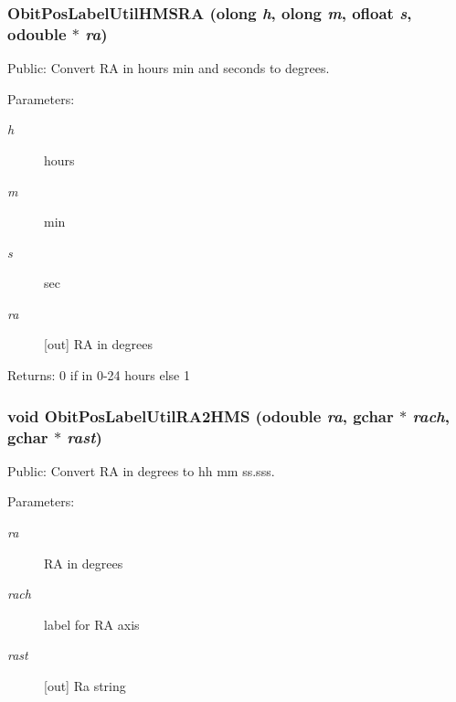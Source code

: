 \subsubsection{ Obit\-Pos\-Label\-Util\-HMSRA ({\bf olong} {\em h}, {\bf olong} {\em m}, {\bf ofloat} {\em s}, {\bf odouble} $\ast$ {\em ra})}\label{ObitPosLabelUtil_8c_a5}


Public: Convert RA in hours min and seconds to degrees. 

\begin{Desc}
\item[Parameters:]
\begin{description}
\item[{\em h}]hours \item[{\em m}]min \item[{\em s}]sec \item[{\em ra}][out] RA in degrees \end{description}
\end{Desc}
\begin{Desc}
\item[Returns:]0 if in 0-24 hours else 1 \end{Desc}
\subsubsection{\setlength{\rightskip}{0pt plus 5cm}void Obit\-Pos\-Label\-Util\-RA2HMS ({\bf odouble} {\em ra}, gchar $\ast$ {\em rach}, gchar $\ast$ {\em rast})}\label{ObitPosLabelUtil_8c_a1}


Public: Convert RA in degrees to hh mm ss.sss. 

\begin{Desc}
\item[Parameters:]
\begin{description}
\item[{\em ra}]RA in degrees \item[{\em rach}]label for RA axis \item[{\em rast}][out] Ra string \end{description}
\end{Desc}
